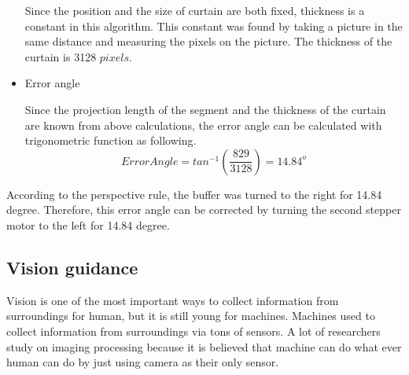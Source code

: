 \documentclass[12pt]{article}
\begin{document}
\begin{flushleft}
\begin{itemize}
	Since the position and the size of curtain are both fixed, thickness is a constant in this algorithm. This constant was found by taking a picture in the same distance and measuring the pixels on the picture. The thickness of the curtain is 3128 $pixels$.
	
	\item Error angle
	
	Since the projection length of the segment and the thickness of the curtain are known from above calculations, the error angle can be calculated with trigonometric function as following.
	\begin{equation}
	Error Angle = tan^{-1}(\frac{829}{3128}) = 14.84^o
	\end{equation}
	
\end{itemize}
According to the perspective rule, the buffer was turned to the right for 14.84 degree. Therefore, this error angle can be corrected by turning the second stepper motor to the left for 14.84 degree. 


\subsection{Vision guidance}
Vision is one of the most important ways to collect information from surroundings for human, but it is still young for machines. Machines used to collect information from surroundings via tons of sensors. A lot of researchers study on imaging processing because it is believed that machine can do what ever human can do by just using camera as their only sensor. 


\end{flushleft}
\end{document}
